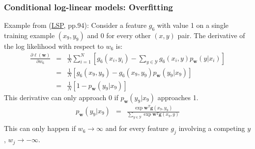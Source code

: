 \documentclass[ignorenonframetext,plain]{beamer}
\renewcommand{\vec}{\mathbf}
\begin{document}
\begin{frame}\frametitle{Conditional log-linear models: Overfitting}
Example from
(\href{http://www.morganclaypool.com/doi/abs/10.2200/S00361ED1V01Y201105HLT013}{LSP},
pp.94): Consider a feature $g_6$ with value 1 on a single training
example $(x_9, y_9)$ and 0 for every other $(x, y)$ pair.  The
derivative of the log likelihood with respect to $w_6$
is: \begin{eqnarray*} \frac{\partial \ell(\vec{w})}{\partial w_6} &=&
  \frac{1}{N} \sum_{i=1}^N \left[ g_6(x_i, y_i) -
    \sum_{y\in\mathcal{Y}} g_6(x_i, y) p_\vec{w}(y|x_i) \right]
  \\ &=& \frac{1}{N} \left[g_6(x_9, y_9) - g_6(x_9, y_9)
    p_\vec{w}(y_9|x_9)\right] \\ &=& \frac{1}{N} \left[ 1 -
    p_\vec{w}(y_9|x_9) \right]
\end{eqnarray*}
This derivative can only approach 0 if $p_\vec{w}(y_9|x_9)$
approaches 1.\begin{eqnarray*}
p_\vec{w}(y_9|x_9) &=& \frac{\exp \vec{w}^T \vec{g}(x_9,y_9)}
{\sum_{y\in\mathcal{Y}} \exp \vec{w}^T \vec{g}(x_9,y)} \\
\end{eqnarray*}
This can only happen if $w_6\rightarrow\infty$ and for every feature
$g_j$ involving a competing $y$, $w_j\rightarrow-\infty$.
\end{frame}
\end{document}
